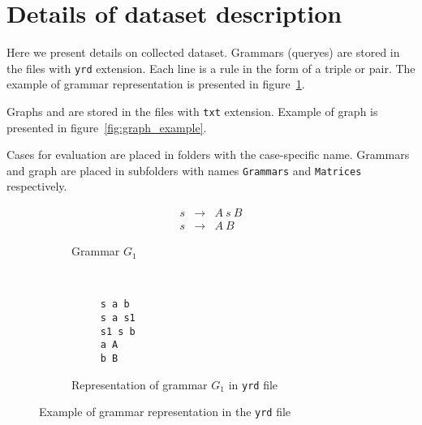 \section{Details of dataset description}

Here we present details on collected dataset.
Grammars (queryes) are stored in the files with \verb|yrd| extension.
Each line is a rule in the form of a triple or pair.
The example of grammar representation is presented in figure~\ref{fig:grammar_example}.

Graphs and are stored in the files with \verb|txt| extension.
Example of graph is presented in figure~\ref{fig:graph_example}.

Cases for evaluation are placed in folders with the case-specific name.
Grammars and graph are placed in subfolders with names \verb|Grammars| and \verb|Matrices| respectively.

\begin{figure}[h]
    \centering
    \begin{subfigure}[b]{0.24\textwidth}
        \centering
        \[
         \begin{array}{rcl}
           s & \rightarrow & A \ s \ B \\
           s & \rightarrow & A \ B
         \end{array}
         \]
        \caption{Grammar $G_1$}
    \end{subfigure}%
    ~
    \begin{subfigure}[b]{0.24\textwidth}
        \centering
        \begin{verbatim}
     s a b
     s a s1
     s1 s b
     a A
     b B
        \end{verbatim}
        \caption{Representation of grammar $G_1$ in \texttt{yrd} file}
    \end{subfigure}
    \caption{Example of grammar representation in the \texttt{yrd} file}
    \label{fig:grammar_example}
\end{figure}


